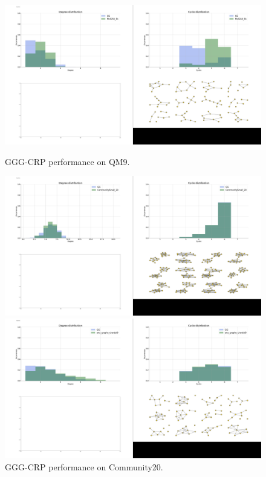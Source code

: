 \begin{figure}
    \centering
    \begin{minipage}{0.475\textwidth}
    \centering
    \includegraphics[width=\textwidth]{figures/gggcrp/QM9.pdf}
    \caption{GGG-CRP performance on QM9.}
    \label{fig:qm9}    
    \end{minipage}
    \hfill
    \begin{minipage}{0.475\textwidth}
    \centering
    \includegraphics[width=\textwidth]{figures/gggcrp/CommunitySmall_20.pdf}
    \caption{GGG-CRP performance on Community20.}
    \label{fig:community_20}    
    \end{minipage}
    \begin{minipage}{0.475\textwidth}
    \centering
    \includegraphics[width=\textwidth]{figures/gggcrp/Chordal9.pdf}

\end{minipage}
\end{figure}
